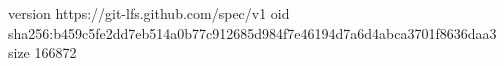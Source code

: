 version https://git-lfs.github.com/spec/v1
oid sha256:b459c5fe2dd7eb514a0b77c912685d984f7e46194d7a6d4abca3701f8636daa3
size 166872
